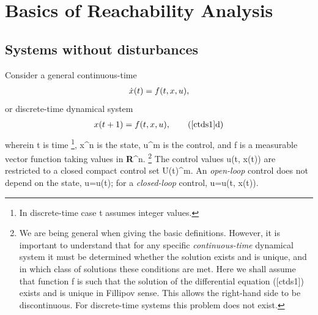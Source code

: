 \documentclass[letterpaper,10pt,english]{sphinxmanual}
\begin{document}
\section{Basics of Reachability Analysis}
\label{chap_reach:basics-of-reachability-analysis}

\subsection{Systems without disturbances}
\label{chap_reach:systems-without-disturbances}
Consider a general continuous-time
\begin{gather}
\begin{split}\dot{x}(t) = f(t, x, u),
\label{ctds1}\end{split}\notag
\end{gather}
or discrete-time dynamical system
\begin{gather}
\begin{split}x(t+1) = f(t, x, u),
\tag*{(\ref{ctds1}d)}
\label{dtds1}\end{split}\notag
\end{gather}
wherein t is time \footnote{
In discrete-time case t assumes integer values.
}, x^n is the state,
u^m is the control, and f is a measurable
vector function taking values in {\bf R}^n. \footnote{
We are being general when giving the basic definitions. However, it
is important to understand that for any specific \emph{continuous-time}
dynamical system it must be determined whether the solution exists
and is unique, and in which class of solutions these conditions are
met. Here we shall assume that function f is such that the
solution of the differential equation ({[}ctds1{]}) exists and is unique
in Fillipov sense. This allows the right-hand side to be
discontinuous. For discrete-time systems this problem does not exist.
} The control
values u(t, x(t)) are restricted to a closed compact control set
{\mathcal U}(t)^m. An \emph{open-loop} control does not
depend on the state, u=u(t); for a \emph{closed-loop} control,
u=u(t, x(t)).
\end{document}
